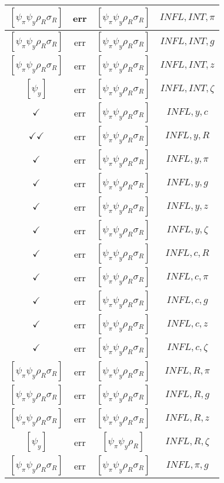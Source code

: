 \documentclass[a4paper,10pt]{article}
\begin{document}
\begin{longtable}{|c|c|c|c|}
\hline
$[\psi_\pi \psi_y \rho_R \sigma_R ]$ & err & $[\psi_\pi \psi_y \rho_R \sigma_R ]$ & ${INFL},{INT},{\pi}$ \\
\hline
$[\psi_\pi \psi_y \rho_R \sigma_R ]$ & err & $[\psi_\pi \psi_y \rho_R \sigma_R ]$ & ${INFL},{INT},{g}$ \\
\hline
$[\psi_\pi \psi_y \rho_R \sigma_R ]$ & err & $[\psi_\pi \psi_y \rho_R \sigma_R ]$ & ${INFL},{INT},{z}$ \\
\hline
$[\psi_y ]$ & err & $[\psi_\pi \psi_y \rho_R \sigma_R ]$ & ${INFL},{INT},{\zeta}$ \\
\hline
$\checkmark$ & err & $[\psi_\pi \psi_y \rho_R \sigma_R ]$ & ${INFL},{y},{c}$ \\
\hline
$\checkmark\checkmark$ & err & $[\psi_\pi \psi_y \rho_R \sigma_R ]$ & ${INFL},{y},{R}$ \\
\hline
$\checkmark$ & err & $[\psi_\pi \psi_y \rho_R \sigma_R ]$ & ${INFL},{y},{\pi}$ \\
\hline
$\checkmark$ & err & $[\psi_\pi \psi_y \rho_R \sigma_R ]$ & ${INFL},{y},{g}$ \\
\hline
$\checkmark$ & err & $[\psi_\pi \psi_y \rho_R \sigma_R ]$ & ${INFL},{y},{z}$ \\
\hline
$\checkmark$ & err & $[\psi_\pi \psi_y \rho_R \sigma_R ]$ & ${INFL},{y},{\zeta}$ \\
\hline
$\checkmark$ & err & $[\psi_\pi \psi_y \rho_R \sigma_R ]$ & ${INFL},{c},{R}$ \\
\hline
$\checkmark$ & err & $[\psi_\pi \psi_y \rho_R \sigma_R ]$ & ${INFL},{c},{\pi}$ \\
\hline
$\checkmark$ & err & $[\psi_\pi \psi_y \rho_R \sigma_R ]$ & ${INFL},{c},{g}$ \\
\hline
$\checkmark$ & err & $[\psi_\pi \psi_y \rho_R \sigma_R ]$ & ${INFL},{c},{z}$ \\
\hline
$\checkmark$ & err & $[\psi_\pi \psi_y \rho_R \sigma_R ]$ & ${INFL},{c},{\zeta}$ \\
\hline
$[\psi_\pi \psi_y \rho_R \sigma_R ]$ & err & $[\psi_\pi \psi_y \rho_R \sigma_R ]$ & ${INFL},{R},{\pi}$ \\
\hline
$[\psi_\pi \psi_y \rho_R \sigma_R ]$ & err & $[\psi_\pi \psi_y \rho_R \sigma_R ]$ & ${INFL},{R},{g}$ \\
\hline
$[\psi_\pi \psi_y \rho_R \sigma_R ]$ & err & $[\psi_\pi \psi_y \rho_R \sigma_R ]$ & ${INFL},{R},{z}$ \\
\hline
$[\psi_y ]$ & err & $[\psi_\pi \psi_y \rho_R ]$ & ${INFL},{R},{\zeta}$ \\
\hline
$[\psi_\pi \psi_y \rho_R \sigma_R ]$ & err & $[\psi_\pi \psi_y \rho_R \sigma_R ]$ & ${INFL},{\pi},{g}$ \\

\end{longtable}
\end{document}
